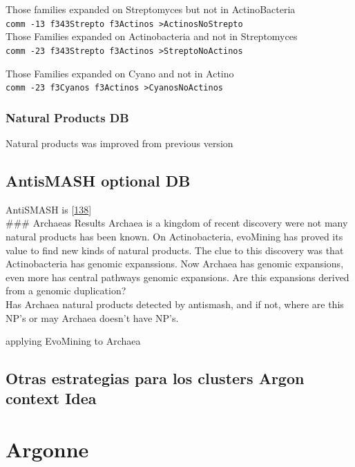 \documentclass[12pt,twoside]{reedthesis}
\begin{document}
  Those families expanded on Streptomyces but not in ActinoBacteria\\
  \texttt{comm\ -13\ f343Strepto\ f3Actinos\ \textgreater{}ActinosNoStrepto}\\
  Those Families expanded on Actinobacteria and not in Streptomyces\\
  \texttt{comm\ -23\ f343Strepto\ f3Actinos\ \textgreater{}StreptoNoActinos}
  
  Those Families expanded on Cyano and not in Actino\\
  \texttt{comm\ -23\ f3Cyanos\ f3Actinos\ \textgreater{}CyanosNoActinos}
  
  \subsubsection{Natural Products DB}\label{natural-products-db}
  
  Natural products was improved from previous version
  
  \subsection{AntisMASH optional DB}\label{antismash-optional-db}
  
  AntiSMASH is
  {[}\protect\hyperlink{ref-weberux5fantismashux5f2015}{138}{]}\\
  \#\#\# Archaeas Results Archaea is a kingdom of recent discovery were
  not many natural products has been known. On Actinobacteria, evoMining
  has proved its value to find new kinds of natural products. The clue to
  this discovery was that Actinobacteria has genomic expanssions. Now
  Archaea has genomic expansions, even more has central pathways genomic
  expansions. Are this expansions derived from a genomic duplication?\\
  Has Archaea natural products detected by antismash, and if not, where
  are this NP's or may Archaea doesn't have NP's.
  
  applying EvoMining to Archaea
  
  \subsection{Otras estrategias para los clusters Argon context
  Idea}\label{otras-estrategias-para-los-clusters-argon-context-idea}
  
  \section{Argonne}\label{argonne}
  
\end{document}
